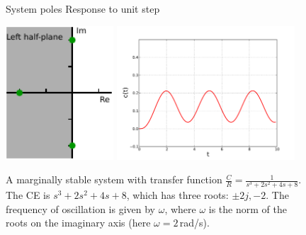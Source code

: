 \documentclass[a4paper,11pt]{report}
\theoremstyle{definition}
\begin{document}
\begin{figure}[H]
  \centering
  \noindent System poles \hspace{2cm} Response to unit step

  \vspace{0.2cm}
  \includegraphics[height=5cm]{fig/stability-marg.pdf}
  \includegraphics[height=5cm]{fig/sys-margstable.pdf}
  \caption{A marginally stable system with transfer function
    $\frac{C}{R}=\frac{1}{s^3+2s^2+4s+8}$. The CE is $s^3+2s^2+4s+8$,
    which has three roots: $\pm 2j, -2$. The frequency of oscillation
    is given by $\omega$, where $\omega$ is the norm of the roots on
    the imaginary axis (here $\omega=2$\,rad/s).}
  \label{fig:ex-margstable}
\end{figure}
\end{document}

